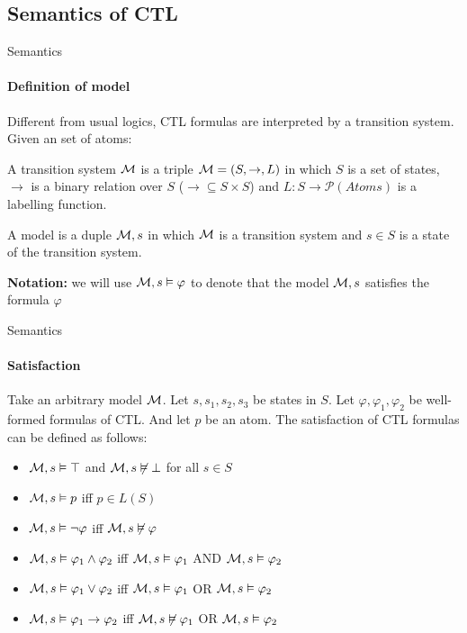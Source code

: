 \subsection{Semantics of CTL}
\begin{frame}{Semantics}
	\framesubtitle{Definition of model}
	Different from usual logics, CTL formulas are interpreted by a transition system. Given an set of atoms:\pause
	\begin{definition}[1]
		A \alert{transition system} $\mathcal{M}$ is a triple $\mathcal{M} = (S, \to, L)$ in which $S$ is a set of states, $\to$ is a binary relation over $S$ ($\to \subseteq S\times S$) and $L: S \to \mathcal{P}(Atoms)$ is a labelling function.
	\end{definition}\pause
	\begin{definition}[2]
		A \alert{model} is a duple $\mathcal{M},s$ in which $\mathcal{M}$ is a transition system and $s \in S$ is a state of the transition system.
	\end{definition}\pause
	
	{\bf Notation:} we will use $\mathcal{M},s\vDash \varphi$ to denote that the model $\mathcal{M},s$ satisfies the formula $\varphi$
\end{frame}


\begin{frame}{Semantics}
	\framesubtitle{Satisfaction}
	Take an arbitrary model $\mathcal{M}$. Let $s, s_1, s_2, s_3$ be states in $S$. Let $\varphi, \varphi_1, \varphi_2$ be well-formed formulas of CTL. And let $p$ be an atom. The satisfaction of CTL formulas can be defined as follows:
	\begin{itemize}
		\item $\mathcal{M},s \vDash \top$ and $\mathcal{M},s \not\vDash \bot$ for all $s \in S$ \pause
		\item $\mathcal{M},s \vDash p$ iff $p \in L(S)$ \pause
		\item $\mathcal{M},s \vDash \neg\varphi$ iff $\mathcal{M},s \not\vDash \varphi$ \pause
		\item $\mathcal{M},s \vDash \varphi_1 \land \varphi_2$ iff $\mathcal{M},s \vDash \varphi_1$ AND $\mathcal{M},s \vDash \varphi_2$ \pause
		\item $\mathcal{M},s \vDash \varphi_1 \lor \varphi_2$ iff $\mathcal{M},s \vDash \varphi_1$ OR $\mathcal{M},s \vDash \varphi_2$ \pause
		\item $\mathcal{M},s \vDash \varphi_1 \to \varphi_2$ iff $\mathcal{M},s \not\vDash \varphi_1$ OR $\mathcal{M},s \vDash \varphi_2$
	\end{itemize}
\end{frame}

